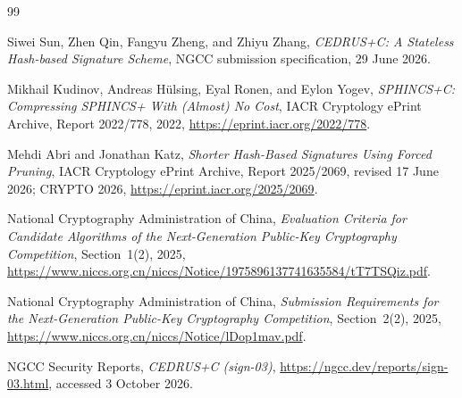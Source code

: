 \documentclass[11pt,a4paper]{article}
\begin{document}
\begin{thebibliography}{99}
\small

Siwei Sun, Zhen Qin, Fangyu Zheng, and Zhiyu Zhang,
\emph{CEDRUS+C: A Stateless Hash-based Signature Scheme},
NGCC submission specification, 29 June 2026.

Mikhail Kudinov, Andreas H\"ulsing, Eyal Ronen, and Eylon Yogev,
\emph{SPHINCS+C: Compressing SPHINCS+ With (Almost) No Cost},
IACR Cryptology ePrint Archive, Report 2022/778, 2022,
\url{https://eprint.iacr.org/2022/778}.

Mehdi Abri and Jonathan Katz,
\emph{Shorter Hash-Based Signatures Using Forced Pruning},
IACR Cryptology ePrint Archive, Report 2025/2069, revised 17 June 2026;
CRYPTO 2026,
\url{https://eprint.iacr.org/2025/2069}.

National Cryptography Administration of China,
\emph{Evaluation Criteria for Candidate Algorithms of the Next-Generation
Public-Key Cryptography Competition}, Section~1(2), 2025,
\url{https://www.niccs.org.cn/niccs/Notice/1975896137741635584/tT7TSQiz.pdf}.

National Cryptography Administration of China,
\emph{Submission Requirements for the Next-Generation Public-Key
Cryptography Competition}, Section~2(2), 2025,
\url{https://www.niccs.org.cn/niccs/Notice/lDop1mav.pdf}.

NGCC Security Reports,
\emph{CEDRUS+C (sign-03)},
\url{https://ngcc.dev/reports/sign-03.html}, accessed 3 October 2026.

\end{thebibliography}
\end{document}
